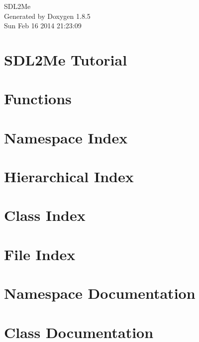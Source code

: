 \documentclass[twoside]{book}
\newcommand{\clearemptydoublepage}{%
  \newpage{\pagestyle{empty}\cleardoublepage}%
}
\begin{document}
\hypersetup{pageanchor=false}
\begin{titlepage}
\vspace*{7cm}
\begin{center}%
{\Large S\-D\-L2\-Me }\\
\vspace*{1cm}
{\large Generated by Doxygen 1.8.5}\\
\vspace*{0.5cm}
{\small Sun Feb 16 2014 21:23:09}\\
\end{center}
\end{titlepage}
\clearemptydoublepage
\tableofcontents
\clearemptydoublepage
{}
\hypersetup{pageanchor=true}

\chapter{S\-D\-L2\-Me Tutorial}
\label{index}\hypertarget{index}{}
\chapter{Functions}
\label{_functions}
\hypertarget{_functions}{}

\chapter{Namespace Index}

\chapter{Hierarchical Index}

\chapter{Class Index}

\chapter{File Index}

\chapter{Namespace Documentation}


\chapter{Class Documentation}


















\end{document}
